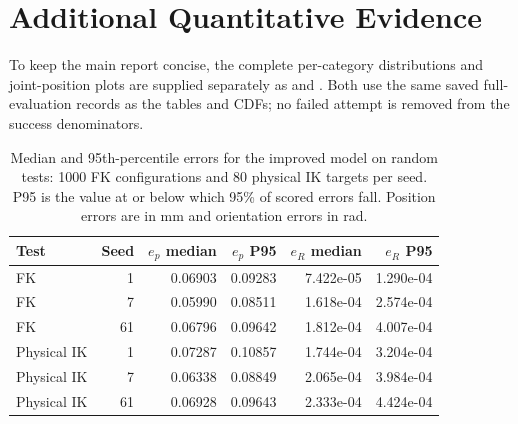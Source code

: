 \documentclass[11pt,letterpaper]{article}
\begin{document}
\clearpage

\appendix
{}
\section{Additional Quantitative Evidence}\label{app:additional}
To keep the main report concise, the complete per-category distributions and joint-position plots are supplied separately as  and . Both use the same saved full-evaluation records as the tables and CDFs; no failed attempt is removed from the success denominators.
\begin{table}[H]\centering\small
\caption{Median and 95th-percentile errors for the improved model on random tests: 1000 FK configurations and 80 physical IK targets per seed. P95 is the value at or below which 95\% of scored errors fall. Position errors are in mm and orientation errors in rad.}\label{tab:percentiles}
\begin{tabular}{@{}lrrrrr@{}}\toprule
Test & Seed & $e_p$ median & $e_p$ P95 & $e_R$ median & $e_R$ P95\\\midrule
FK & 1 & 0.06903 & 0.09283 & 7.422e-05 & 1.290e-04\\
FK & 7 & 0.05990 & 0.08511 & 1.618e-04 & 2.574e-04\\
FK & 61 & 0.06796 & 0.09642 & 1.812e-04 & 4.007e-04\\
Physical IK & 1 & 0.07287 & 0.10857 & 1.744e-04 & 3.204e-04\\
Physical IK & 7 & 0.06338 & 0.08849 & 2.065e-04 & 3.984e-04\\
Physical IK & 61 & 0.06928 & 0.09643 & 2.333e-04 & 4.424e-04\\
\bottomrule\end{tabular}
\end{table}
\end{document}
